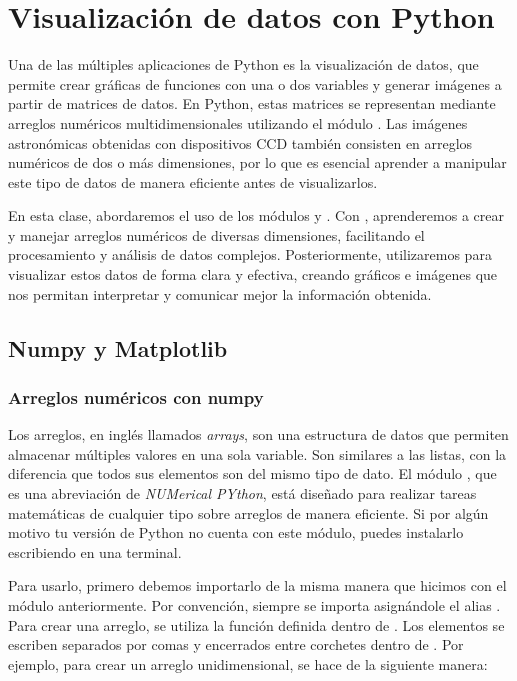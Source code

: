 \chapter{Visualización de datos con Python}

\setcounter{ipythcntr}{0}

Una de las múltiples aplicaciones de Python es la visualización de datos, que permite crear gráficas de funciones con una o dos variables y generar imágenes a partir de matrices de datos. En Python, estas matrices se representan mediante arreglos numéricos multidimensionales utilizando el módulo . Las imágenes astronómicas obtenidas con dispositivos CCD también consisten en arreglos numéricos de dos o más dimensiones, por lo que es esencial aprender a manipular este tipo de datos de manera eficiente antes de visualizarlos.

En esta clase, abordaremos el uso de los módulos  y . Con , aprenderemos a crear y manejar arreglos numéricos de diversas dimensiones, facilitando el procesamiento y análisis de datos complejos. Posteriormente, utilizaremos  para visualizar estos datos de forma clara y efectiva, creando gráficos e imágenes que nos permitan interpretar y comunicar mejor la información obtenida.

\section{Numpy y Matplotlib}
\subsection{Arreglos numéricos con numpy}
Los arreglos, en inglés llamados \emph{arrays}, son una estructura de datos que permiten almacenar múltiples valores en una sola variable. Son similares a las listas, con la diferencia que todos sus elementos son del mismo tipo de dato. El módulo , que es una abreviación de \emph{NUMerical PYthon}, está diseñado para realizar tareas matemáticas de cualquier tipo sobre arreglos de manera eficiente. Si por algún motivo tu versión de Python no cuenta con este módulo, puedes instalarlo escribiendo  en una terminal.

Para usarlo, primero debemos importarlo de la misma manera que hicimos con el módulo  anteriormente. Por convención,  siempre se importa asignándole el alias . Para crear una arreglo, se utiliza la función  definida dentro de . Los elementos se escriben separados por comas y encerrados entre corchetes dentro de . Por ejemplo, para crear un arreglo unidimensional, se hace de la siguiente manera: 

